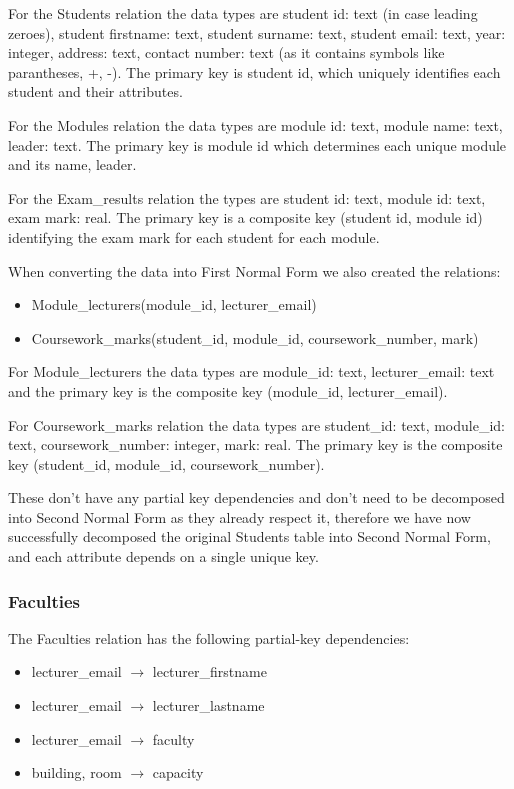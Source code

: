For the Students relation the data types are student id: text (in case leading zeroes), student firstname: text, student surname: text, student email: text, year: integer, address: text, contact number: text (as it contains symbols like parantheses, +, -). The primary key is student id, which uniquely identifies each student and their attributes.

For the Modules relation the data types are module id: text, module name: text, leader: text. The primary key is module id which determines each unique module and its name, leader.

For the Exam_results relation the types are student id: text, module id: text, exam mark: real. The primary key is a composite key (student id, module id) identifying the exam mark for each student for each module.

When converting the data into First Normal Form we also created the relations:

\begin{itemize}
    \item Module_lecturers(module_id, lecturer_email) 
    \item Coursework_marks(student_id, module_id, coursework_number, mark)  
\end{itemize}

For Module_lecturers the data types are module_id: text, lecturer_email: text and the primary key is the composite key (module_id, lecturer_email).

For Coursework_marks relation the data types are student_id: text, module_id: text, coursework_number: integer, mark: real. The primary key is the composite key (student_id, module_id, coursework_number).

These don’t have any partial key dependencies and don’t need to be decomposed into Second Normal Form as they already respect it, therefore we have now successfully decomposed the original Students table into Second Normal Form, and each attribute depends on a single unique key.

\subsubsection*{Faculties}

The Faculties relation has the following partial-key dependencies:

\begin{itemize}
    \item lecturer_email $\rightarrow$ lecturer_firstname
    \item lecturer_email $\rightarrow$ lecturer_lastname
    \item lecturer_email $\rightarrow$ faculty
    \item building, room $\rightarrow$ capacity
\end{itemize}

